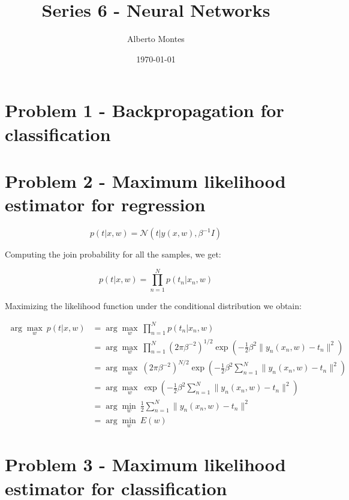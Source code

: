 \documentclass{ethz_report}
\title{Series 6 - Neural Networks}
\author{Alberto Montes}
\date{\today}
\begin{document}
\maketitle

\section*{Problem 1 - Backpropagation for classification}


\section*{Problem 2 - Maximum likelihood estimator for regression}

\begin{equation}
    p(t|x,w) = \mathcal{N}(t|y(x,w),\beta^{-1} I)
\end{equation}

Computing the join probability for all the samples, we get:

\begin{equation}
    p(t|x,w) = \prod_{n=1}^N p(t_n|x_n, w)
\end{equation}

Maximizing the likelihood function under the conditional distribution we obtain:

\begin{align}
    \arg\max_w~p(t|x,w) &= \arg\max_w~\prod_{n=1}^N p(t_n|x_n, w) \\
    &= \arg\max_w~\prod_{n=1}^N (2 \pi \beta^{-2})^{1/2} \exp \left( -\frac{1}{2} \beta^2 \| y_n(x_n,w)-t_n \|^2 \right) \\
    &= \arg\max_w~(2 \pi \beta^{-2})^{N/2} \exp \left( -\frac{1}{2} \beta^2 \sum_{n=1}^N \| y_n(x_n,w)-t_n \|^2 \right) \\
    &= \arg\max_w~\exp \left( -\frac{1}{2} \beta^2 \sum_{n=1}^N \| y_n(x_n,w)-t_n \|^2 \right) \\
    &= \arg\min_w~\frac{1}{2} \sum_{n=1}^N \| y_n(x_n,w)-t_n \|^2 \\
    &= \arg\min_w~E(w)
\end{align}

\section*{Problem 3 - Maximum likelihood estimator for classification}
\end{document}
